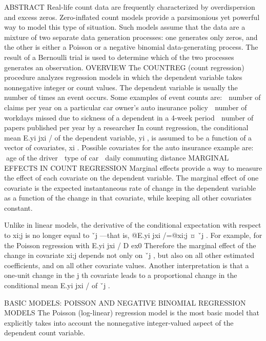 
ABSTRACT
Real-life count data are frequently characterized by overdispersion and excess zeros. Zero-inflated count models
provide a parsimonious yet powerful way to model this type of situation. Such models assume that the data are a
mixture of two separate data generation processes: one generates only zeros, and the other is either a Poisson or
a negative binomial data-generating process. The result of a Bernoulli trial is used to determine which of the two
processes generates an observation.
OVERVIEW
The COUNTREG (count regression) procedure analyzes regression models in which the dependent variable takes
nonnegative integer or count values. The dependent variable is usually the number of times an event occurs. Some
examples of event counts are:
 number of claims per year on a particular car owner’s auto insurance policy
 number of workdays missed due to sickness of a dependent in a 4-week period
 number of papers published per year by a researcher
In count regression, the conditional mean E.yi jxi / of the dependent variable, yi , is assumed to be a function of a vector
of covariates, xi . Possible covariates for the auto insurance example are:
 age of the driver
 type of car
 daily commuting distance
MARGINAL EFFECTS IN COUNT REGRESSION
Marginal effects provide a way to measure the effect of each covariate on the dependent variable. The marginal effect
of one covariate is the expected instantaneous rate of change in the dependent variable as a function of the change
in that covariate, while keeping all other covariates constant. 

Unlike in linear models, the derivative of the conditional
expectation with respect to xi;j is no longer equal to ˇj —that is, @E.yi jxi /=@xi;j ¤ ˇj . For example, for the Poisson
regression with E.yi jxi / D ex0
Therefore the marginal effect of the change in covariate xi;j depends not only on ˇj , but also on all other estimated
coefficients, and on all other covariate values. Another interpretation is that a one-unit change in the j th covariate leads
to a proportional change in the conditional mean E.yi jxi / of ˇj .

BASIC MODELS: POISSON AND NEGATIVE BINOMIAL REGRESSION MODELS
The Poisson (log-linear) regression model is the most basic model that explicitly takes into account the nonnegative
integer-valued aspect of the dependent count variable. 

